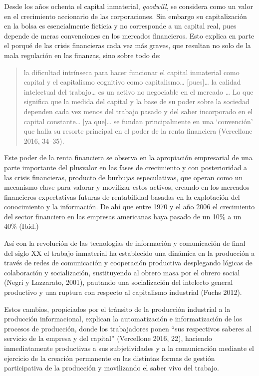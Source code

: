 \documentclass[
]{interact}
\begin{document}
Desde los años ochenta el capital inmaterial, \emph{goodwill}, se
considera como un valor en el crecimiento accionario de las
corporaciones. Sin embargo su capitalización en la bolsa es
esencialmente ficticia y no corresponde a un capital real, pues depende
de meras convenciones en los mercados financieros. Esto explica en parte
el porqué de las crisis financieras cada vez más graves, que resultan no
solo de la mala regulación en las finanzas, sino sobre todo de:

\begin{quote}
la dificultad intrínseca para hacer funcionar el capital inmaterial como
capital y el capitalismo cognitivo como capitalismo\ldots{}
{[}pues{]}\ldots{} la calidad intelectual del trabajo\ldots{} es un
activo no negociable en el mercado \ldots{} Lo que significa que la
medida del capital y la base de su poder sobre la sociedad dependen cada
vez menos del trabajo pasado y del saber incorporado en el capital
constante\ldots{} {[}ya que{]}\ldots{} se fundan principalmente en una
`convención' que halla su resorte principal en el poder de la renta
financiera (Vercellone 2016, 34--35).
\end{quote}

Este poder de la renta financiera se observa en la apropiación
empresarial de una parte importante del plusvalor en las fases de
crecimiento y con posterioridad a las crisis financieras, producto de
burbujas especulativas, que operan como un mecanismo clave para valorar
y movilizar estos activos, creando en los mercados financieros
expectativas futuras de rentabilidad basadas en la explotación del
conocimiento y la información. De ahí que entre 1970 y el año 2006 el
crecimiento del sector financiero en las empresas americanas haya pasado
de un 10\% a un 40\% (Ibíd.)

Así con la revolución de las tecnologías de información y comunicación
de final del siglo XX el trabajo inmaterial ha establecido una dinámica
en la producción a través de redes de comunicación y cooperación
productiva desplegando lógicas de colaboración y socialización,
sustituyendo al obrero masa por el obrero social (Negri y Lazzarato,
2001), pautando una socialización del intelecto general productivo y una
ruptura con respecto al capitalismo industrial (Fuchs 2012).

Estos cambios, propiciados por el tránsito de la producción industrial a
la producción informacional, explican la automatización e
informatización de los procesos de producción, donde los trabajadores
ponen ``sus respectivos saberes al servicio de la empresa y del
capital'' (Vercellone 2016, 22), haciendo inmediatamente productivas a
sus subjetividades y a la comunicación mediante el ejercicio de la
creación permanente en las distintas formas de gestión participativa de
la producción y movilizando el saber vivo del trabajo.
\end{document}
